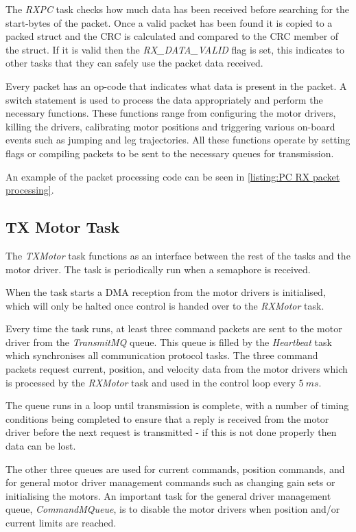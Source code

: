 The \textit{RXPC} task checks how much data has been received before searching for the start-bytes of the packet. Once a valid packet has been found it is copied to a packed struct  and the CRC is calculated and compared to the CRC member of the struct. If it is valid then the \textit{RX\_DATA\_VALID} flag is set, this indicates to other tasks that they can safely use the packet data received. 

Every packet has an op-code that indicates what data is present in the packet. A switch statement is used to process the data appropriately and perform the necessary functions. These functions range from configuring the motor drivers, killing the drivers, calibrating motor positions and triggering various on-board events such as jumping and leg trajectories. All these functions operate by setting flags or compiling packets to be sent to the necessary queues for transmission.

An example of the packet processing code can be seen in \cref{listing:PC RX packet processing}.

\subsection{TX Motor Task}
The \textit{TXMotor} task functions as an interface between the rest of the tasks and the motor driver. The task is periodically run when a semaphore is received.

When the task starts a DMA reception from the motor drivers is initialised, which will only be halted once control is handed over to the \textit{RXMotor} task. 

Every time the task runs, at least three command packets are sent to the motor driver from the \textit{TransmitMQ} queue. This queue is filled by the \textit{Heartbeat} task which synchronises all communication protocol tasks. The three command packets request current, position, and velocity data from the motor drivers which is processed by the \textit{RXMotor} task and used in the control loop every $5\ ms$. 

The queue runs in a loop until transmission is complete, with a number of timing conditions being completed to ensure that a reply is received from the motor driver before the next request is transmitted - if this is not done properly then data can be lost. 

The other three queues are used for current commands, position commands, and for general motor driver management commands such as changing gain sets or initialising the motors. An important task for the general driver management queue, \textit{CommandMQueue}, is to disable the motor drivers when position and/or current limits are reached.

